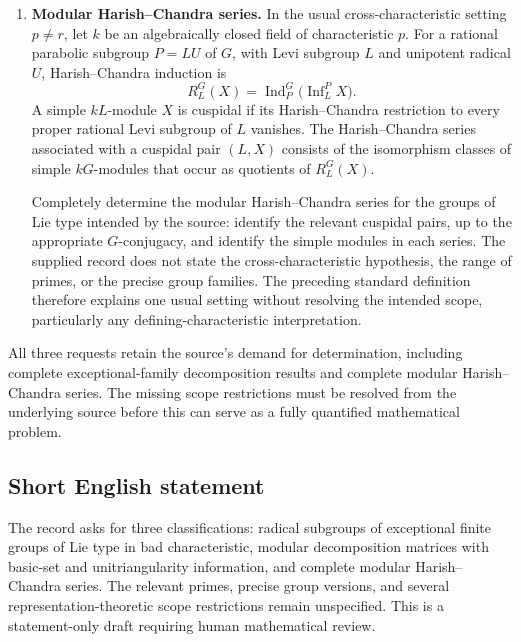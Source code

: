 \documentclass[11pt]{article}
\begin{document}
\begin{enumerate}
\item \textbf{Modular Harish--Chandra series.} In the usual cross-characteristic setting \(p\ne r\), let \(k\) be an algebraically closed field of characteristic \(p\). For a rational parabolic subgroup \(P=LU\) of \(G\), with Levi subgroup \(L\) and unipotent radical \(U\), Harish--Chandra induction is
\[
R_L^G(X)=\operatorname{Ind}_P^G
 \bigl(\operatorname{Inf}_L^P X\bigr).
\]
A simple \(kL\)-module \(X\) is cuspidal if its Harish--Chandra restriction to every proper rational Levi subgroup of \(L\) vanishes. The Harish--Chandra series associated with a cuspidal pair \((L,X)\) consists of the isomorphism classes of simple \(kG\)-modules that occur as quotients of \(R_L^G(X)\).

Completely determine the modular Harish--Chandra series for the groups of Lie type intended by the source: identify the relevant cuspidal pairs, up to the appropriate \(G\)-conjugacy, and identify the simple modules in each series. The supplied record does not state the cross-characteristic hypothesis, the range of primes, or the precise group families. The preceding standard definition therefore explains one usual setting without resolving the intended scope, particularly any defining-characteristic interpretation.
\end{enumerate}

All three requests retain the source's demand for determination, including complete exceptional-family decomposition results and complete modular Harish--Chandra series. The missing scope restrictions must be resolved from the underlying source before this can serve as a fully quantified mathematical problem.
\subsection{Short English statement}
The record asks for three classifications: radical subgroups of exceptional finite groups of Lie type in bad characteristic, modular decomposition matrices with basic-set and unitriangularity information, and complete modular Harish--Chandra series. The relevant primes, precise group versions, and several representation-theoretic scope restrictions remain unspecified. This is a statement-only draft requiring human mathematical review.
\end{document}
